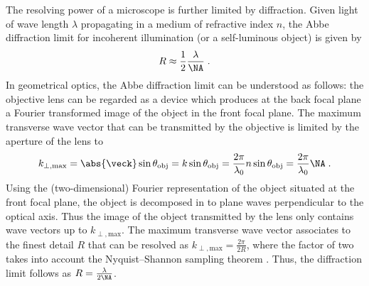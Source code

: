 \documentclass[
twoside,
openright,
titlepage,
numbers=noenddot,
headinclude,
fleqn,
a4paper,
footinclude=true,
cleardoublepage=empty,
abstractoff,
BCOR=5mm,
paper=a4,
fontsize=11pt,
british,ngerman,american,
]{scrreprt}
\begin{document}
The resolving power of a microscope is further limited by diffraction.
Given light of wave length $\lambda$ propagating in a medium of
refractive index $n$, the Abbe diffraction limit for incoherent
illumination (or a self-luminous object) is given by \cite{BornWolf}
\begin{equation}
  \label{eq:diff-limit}
  R\approx \frac12\frac{\lambda}{\NA}\;.
\end{equation}
In geometrical optics, the Abbe diffraction limit can be understood as
follows: the objective lens can be regarded as a device which produces
at the back focal plane a Fourier transformed image of the object in
the front focal plane.  The maximum transverse wave vector that can be
transmitted by the objective is limited by the aperture of the lens to
\begin{equation}
  \begin{split}
    k_{\perp,\mathrm{max}} = \abs{\veck}\sin\theta_{\mathrm{obj}}
    = k\sin\theta_{\mathrm{obj}}
    = \frac{2\pi}{\lambda_0}n\sin\theta_{\mathrm{obj}}
    = \frac{2\pi}{\lambda_0} \NA \;.
  \end{split}
\end{equation}
Using the (two-dimensional) Fourier representation of the object
situated at the front focal plane, the object is decomposed in to
plane waves perpendicular to the optical axis.  Thus the image of the
object transmitted by the lens only contains wave vectors up to
$k_{\perp,\mathrm{max}}$.  The maximum transverse wave vector
associates to the finest detail $R$ that can be resolved as
$k_{\perp,\mathrm{max}}=\frac{2\pi}{2R}$, where the factor of two
takes into account the Nyquist–Shannon sampling theorem
\cite{Nyquist1928,Shannon1949}.  Thus, the diffraction limit 
follows as $R=\frac{\lambda}{2\NA}$.
\end{document}
